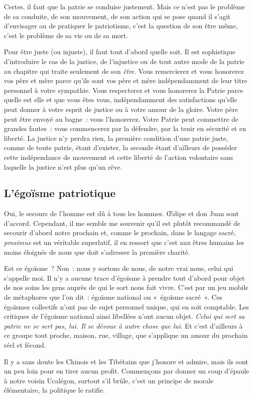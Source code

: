 \documentclass[french,twoside]{book} %
\newcommand{\astermono}{\medskip\centerline{\color{rubric}\large\selectfont{\syms ✻}}\medskip\par}%
\begin{document}
\astermono

\noindent Certes, il faut que la patrie se conduise justement. Mais ce n’est pas le problème de sa conduite, de son mouvement, de son action qui se pose quand il s’agit d’envisager ou de pratiquer le patriotisme, c’est la question de son être même, c’est le problème de sa vie ou de sa mort.\par
Pour être juste (ou injuste), il faut tout d’abord quelle soit. Il est sophistique d’introduire le cas de la justice, de l’injustice ou de tout autre mode de la patrie au chapitre qui traite seulement de son \emph{être}. Vous remercierez et vous honorerez vos père et mère parce qu’ils sont vos père et mère indépendamment de leur titre personnel à votre sympathie. Vous respecterez et vous honorerez la Patrie parce quelle est elle et que vous êtes vous, indépendamment des satisfactions qu’elle peut donner à votre esprit de justice ou à votre amour de la gloire. Votre père peut être envoyé au bagne : vous l’honorerez. Votre Patrie peut commettre de grandes fautes : vous commencerez par la défendre, par la tenir en sécurité et en liberté. La justice n’y perdra rien, la première condition d’une patrie juste, comme de toute patrie, étant d’exister, la seconde étant d’ailleurs de posséder cette indépendance de mouvement et cette liberté de l’action volontaire sans laquelle la justice n’est plus qu’un rêve.\par

\astermono

\subsection[{L’égoïsme patriotique}]{L’égoïsme patriotique}
\noindent Oui, le secours de l’homme est dû à tous les hommes. Œdipe et don Juan sont d’accord. Cependant, il me semble me souvenir qu’il est plutôt recommandé de secourir d’abord notre prochain et, comme le prochain, dans le langage sacré, \emph{proximus} est un véritable superlatif, il en ressort que c’est aux êtres humains les moins éloignés de nous que doit s’adresser la première charité.\par
Est ce égoïsme ? Non : nous y sortons de nous, de notre vrai nous, celui qui s’appelle moi. Il n’y a aucune trace d’égoïsme à prendre tout d’abord pour objet de nos soins les gens auprès de qui le sort nous fait vivre. C’est par un jeu mobile de métaphores que l’on dit : égoïsme national ou « égoïsme sacré ». Ces égoïsmes collectifs n’ont pas de sujet personnel unique, qui en soit comptable. Les critiques de l’égoïsme national ainsi libellées n’ont aucun objet. \emph{Celui qui sert sa patrie ne se sert pas, lui. Il se dévoue à autre chose que lui}. Et c’est d’ailleurs à ce groupe tout proche, maison, rue, village, que s’applique un amour du prochain réel et fécond.\par
Il y a sans doute les Chinois et les Tibétains que j’honore et admire, mais ils sont un peu loin pour en tirer aucun profit. Commençons par donner un coup d’épaule à notre voisin Ucalégon, surtout s’il brûle, c’est un principe de morale élémentaire, la politique le ratifie.
\end{document}
